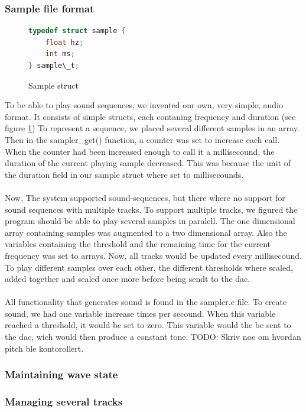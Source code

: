 \subsubsection{Sample file format}
\begin{figure}[h]
	\centering
	\begin{lstlisting}[language=C]
typedef struct sample {
	float hz;
	int ms;
} sample\_t;
	\end{lstlisting}
	\caption{Sample struct}
	\label{file_format_struct}
\end{figure}
To be able to play sound sequences, we invented our own, very simple, audio format. It consists of simple structs, each contaning frequency and duration (see figure \ref{file_format_struct}) To represent a sequence, we placed several different samples in an array. Then in the sampler\_get() function, a counter was set to increase each call. When the counter had been increased enough to call it a millisecound, the duration of the current playing sample decreased. This was because the  unit of the duration field in our sample struct where set to millisecounds.\\
\\
Now, The system supported sound-sequences, but there where no support for sound sequences with multiple tracks. To support multiple tracks, we figured the program should be able to play several samples in paralell. The one dimensional array containing samples was augmented to a two dimensional array. Also the variables containing the threshold and the remaining time for the current frequency was set to arrays. Now, all tracks would be updated every millisecound. To play different samples over each other, the different thresholds where scaled, added together and scaled once more before being sendt to the dac.\\
\\
All functionality that generates sound is found in the sampler.c file. To create sound, we had one variable increase \samplerPullsPerSecound times per secound. When this variable reached a threshold, it would be set to zero. This variable would the be sent to the dac, wich would  then produce a constant tone. TODO: Skriv noe om hvordan pitch ble kontorollert. \\

\subsubsection{Maintaining wave state}

\subsubsection{Managing several tracks}

